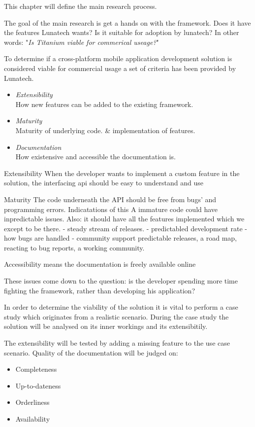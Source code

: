 This chapter will define the main research process. 

The goal of the main research is get a hands on with the framework. Does it have the features Lunatech wants? Is it suitable for adoption by lunatech? In other words: "\emph{Is Titanium viable for commerical useage?}"

To determine if a cross-platform mobile application development solution is considered viable for commercial usage a set of criteria has been provided by Lunatech.
\begin{itemize}
	\item \emph{Extensibility}\\
	How new features can be added to the existing framework.
	\item \emph{Maturity}\\ 
	Maturity of underlying code. & implementation of features.
	\item \emph{Documentation}\\
	How existensive and accessible the documentation is.
\end{itemize}

Extensibility
When the developer wants to implement a custom feature in the solution, the interfacing api should be easy to understand and use

Maturity
The code underneath the API should be free from bugs' and programming errors.
Indicatations of this 
A immature code could have inpredictable issues.
Also: it should have all the features implemented which we except to be there. 
- steady stream of releases.
- predictabled development rate
- how bugs are handled
- community support
predictable releases, a road map, reacting to bug reports, a working community.


Accessibility means the documentation is freely available online %

These issues come down to the question:
is the developer spending more time fighting the framework, rather than developing his application?

In order to determine the viability of the solution it is vital to perform a case study which originates from a realistic scenario. During the case study the solution will be analysed on its inner workings and its extensibitily.

The extensibility will be tested by adding a missing feature to the use case scenario.
Quality of the documentation will be judged on:
\begin{itemize}
	\item Completeness
	\item Up-to-dateness
	\item Orderliness
	\item Availability
\end{itemize}

